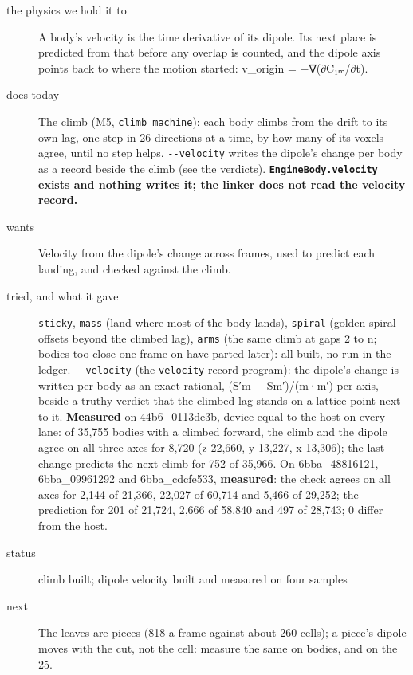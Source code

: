\begin{description}
\item[{the physics we hold it to}] A body's velocity is the time derivative of its dipole. Its next place is predicted from that before any overlap is counted, and the dipole axis points back to where the motion started: v\_\allowbreak{}origin = −∇(∂C₁ₘ/∂t).
\item[{does today}] The climb (M5, \texttt{climb\_\allowbreak{}machine}): each body climbs from the drift to its own lag, one step in 26 directions at a time, by how many of its voxels agree, until no step helps. \texttt{-\allowbreak{}-\allowbreak{}velocity} writes the dipole's change per body as a record beside the climb (see the verdicts). \textbf{\texttt{Engine\allowbreak{}Body.\allowbreak{}velocity} exists and nothing writes it; the linker does not read the velocity record.}
\item[{wants}] Velocity from the dipole's change across frames, used to predict each landing, and checked against the climb.
\item[{tried, and what it gave}] \texttt{sticky}, \texttt{mass} (land where most of the body lands), \texttt{spiral} (golden spiral offsets beyond the climbed lag), \texttt{arms} (the same climb at gaps 2 to n; bodies too close one frame on have parted later): all built, no run in the ledger. \texttt{-\allowbreak{}-\allowbreak{}velocity} (the \texttt{velocity} record program): the dipole's change is written per body as an exact rational, (S′m − Sm′)/(m·m′) per axis, beside a truthy verdict that the climbed lag stands on a lattice point next to it. \textbf{Measured} on 44b6\_\allowbreak{}0113de3b, device equal to the host on every lane: of 35,755 bodies with a climbed forward, the climb and the dipole agree on all three axes for 8,720 (z 22,660, y 13,227, x 13,306); the last change predicts the next climb for 752 of 35,966. On 6bba\_\allowbreak{}48816121, 6bba\_\allowbreak{}09961292 and 6bba\_\allowbreak{}cdcfe533, \textbf{measured}: the check agrees on all axes for 2,144 of 21,366, 22,027 of 60,714 and 5,466 of 29,252; the prediction for 201 of 21,724, 2,666 of 58,840 and 497 of 28,743; 0 differ from the host.
\item[{status}] climb built; dipole velocity built and measured on four samples
\item[{next}] The leaves are pieces (818 a frame against about 260 cells); a piece's dipole moves with the cut, not the cell: measure the same on bodies, and on the 25.
\end{description}

